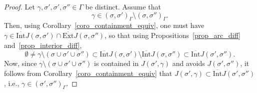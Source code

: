 \documentclass[a4paper, 11pt]{article} %
\theoremstyle{plain}
\newcommand{\clInt}{\overline{\mathrm{Int}}}
\newcommand{\clExt}{\overline{\mathrm{Ext}}}
\newcommand{\1}{\mathds 1}
\numberwithin{equation}{section}
\begin{document}
\begin{proof}
    Let $\gamma,\sigma',\sigma',\sigma''\in\Gamma$ be distinct. Assume that
        \[\gamma\in(\sigma,\sigma')_\Gamma\setminus(\sigma,\sigma'')_\Gamma.\]
    Then, using Corollary~\ref{coro_containment_equiv}, one must have $\gamma\in\clInt J(\sigma,\sigma')\cap\clExt J(\sigma,\sigma'')$, so that using Propositions~\ref{prop_arc_diff} and~\ref{prop_interior_diff},
        \[\emptyset\neq\gamma\setminus(\sigma\cup\sigma'\cup\sigma'')\subset\clInt J(\sigma,\sigma')\setminus\clInt J(\sigma,\sigma'')\subset\clInt J(\sigma',\sigma'').\]
    Now, since $\gamma\setminus(\sigma\cup\sigma'\cup\sigma'')$ is contained in $J(\sigma',\gamma)$ and avoids $J(\sigma',\sigma'')$, it follows from Corollary~\ref{coro_containment_equiv} that $J(\sigma',\gamma)\subset\clInt J(\sigma',\sigma'')$, i.e., $\gamma\in (\sigma',\sigma'')_\Gamma$. 
    

\end{proof}
\end{document}
